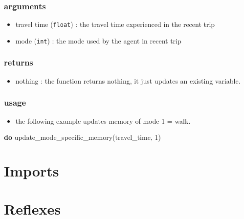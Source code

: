 \documentclass[]{book}
\newenvironment{Shaded}{\begin{snugshade}}{\end{snugshade}}
\newcommand{\DecValTok}[1]{\textcolor[rgb]{0.00,0.00,0.81}{#1}}
\newcommand{\KeywordTok}[1]{\textcolor[rgb]{0.13,0.29,0.53}{\textbf{#1}}}
\newcommand{\NormalTok}[1]{#1}
\newcommand{\OtherTok}[1]{\textcolor[rgb]{0.56,0.35,0.01}{#1}}
\providecommand{\tightlist}{%
  \setlength{\itemsep}{0pt}\setlength{\parskip}{0pt}}
\theoremstyle{definition}
\theoremstyle{definition}
\theoremstyle{definition}
\theoremstyle{remark}
\begin{document}
\hypertarget{arguments}{%
\subsection*{arguments}\label{arguments}}

\begin{itemize}
\tightlist
\item
  travel time (\texttt{float}) : the travel time experienced in the
  recent trip
\item
  mode (\texttt{int}) : the mode used by the agent in recent trip
\end{itemize}

\hypertarget{returns}{%
\subsection*{returns}\label{returns}}

\begin{itemize}
\tightlist
\item
  nothing : the function returns nothing, it just updates an existing
  variable.
\end{itemize}

\hypertarget{usage}{%
\subsection*{usage}\label{usage}}

\begin{itemize}
\tightlist
\item
  the following example updates memory of mode 1 = walk.
\end{itemize}

\begin{Shaded}
\begin{Highlighting}[]
\KeywordTok{do}\NormalTok{ update_mode_specific_memory}\OtherTok{(}\NormalTok{travel_time}\OtherTok{,} \DecValTok{1}\OtherTok{)}
\end{Highlighting}
\end{Shaded}

\hypertarget{imports}{%
\chapter{Imports}\label{imports}}

\hypertarget{reflexes}{%
\chapter{Reflexes}\label{reflexes}}
\end{document}
